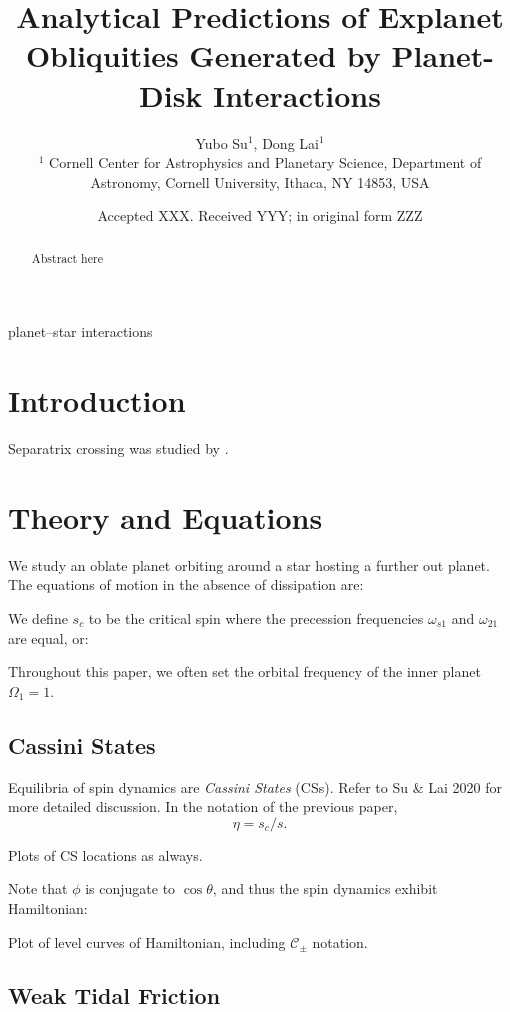 \documentclass[
        fleqn,
        usenatbib,
        referee,
    ]{mnras}
\title[Analytical Exoplanet Obliquities]{Analytical Predictions of Explanet
Obliquities Generated by Planet-Disk Interactions}
\author[Y. Su and D. Lai]{
Yubo Su$^1$,
Dong Lai$^1$
\\
$^1$ Cornell Center for Astrophysics and Planetary Science, Department of
Astronomy, Cornell University, Ithaca, NY 14853, USA
}
\date{Accepted XXX\@. Received YYY\@; in original form ZZZ}
\begin{document}
\label{firstpage}
\pagerange{\pageref{firstpage}--\pageref{lastpage}}
\maketitle

\begin{abstract}
    Abstract here
\end{abstract}

\begin{keywords}
planet--star interactions %
\end{keywords}

\section{Introduction}

Separatrix crossing was studied by \citep{henrard1982}.

\section{Theory and Equations}\label{s:theory}

We study an oblate planet orbiting around a star hosting a further out planet.
The equations of motion in the absence of dissipation are:

We define $s_c$ to be the critical spin where the precession frequencies
$\omega_{s1}$ and $\omega_{21}$ are equal, or:

Throughout this paper, we often set the orbital frequency of the inner planet
$\Omega_1 = 1$.

\subsection{Cassini States}\label{ss:cs_theory}

Equilibria of spin dynamics are \emph{Cassini States} (CSs). Refer to Su \& Lai
2020 for more detailed discussion. In the notation of the previous paper,
\begin{equation}
    \eta = s_c / s.
\end{equation}

Plots of CS locations as always.

Note that $\phi$ is conjugate to $\cos \theta$, and thus the spin dynamics
exhibit Hamiltonian:

Plot of level curves of Hamiltonian, including $\mathcal{C}_{\pm}$ notation.

\subsection{Weak Tidal Friction}\label{ss:weak_tides}
\end{document}
